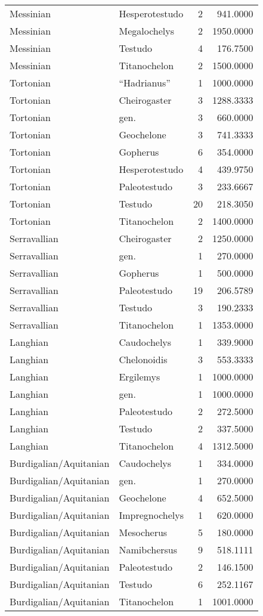 \begin{longtable}[]{@{}llrr@{}}
	Messinian & Hesperotestudo & 2 & 941.0000\tabularnewline
	Messinian & Megalochelys & 2 & 1950.0000\tabularnewline
	Messinian & Testudo & 4 & 176.7500\tabularnewline
	Messinian & Titanochelon & 2 & 1500.0000\tabularnewline
	Tortonian & ``Hadrianus'' & 1 & 1000.0000\tabularnewline
	Tortonian & Cheirogaster & 3 & 1288.3333\tabularnewline
	Tortonian & gen. & 3 & 660.0000\tabularnewline
	Tortonian & Geochelone & 3 & 741.3333\tabularnewline
	Tortonian & Gopherus & 6 & 354.0000\tabularnewline
	Tortonian & Hesperotestudo & 4 & 439.9750\tabularnewline
	Tortonian & Paleotestudo & 3 & 233.6667\tabularnewline
	Tortonian & Testudo & 20 & 218.3050\tabularnewline
	Tortonian & Titanochelon & 2 & 1400.0000\tabularnewline
	Serravallian & Cheirogaster & 2 & 1250.0000\tabularnewline
	Serravallian & gen. & 1 & 270.0000\tabularnewline
	Serravallian & Gopherus & 1 & 500.0000\tabularnewline
	Serravallian & Paleotestudo & 19 & 206.5789\tabularnewline
	Serravallian & Testudo & 3 & 190.2333\tabularnewline
	Serravallian & Titanochelon & 1 & 1353.0000\tabularnewline
	Langhian & Caudochelys & 1 & 339.9000\tabularnewline
	Langhian & Chelonoidis & 3 & 553.3333\tabularnewline
	Langhian & Ergilemys & 1 & 1000.0000\tabularnewline
	Langhian & gen. & 1 & 1000.0000\tabularnewline
	Langhian & Paleotestudo & 2 & 272.5000\tabularnewline
	Langhian & Testudo & 2 & 337.5000\tabularnewline
	Langhian & Titanochelon & 4 & 1312.5000\tabularnewline
	Burdigalian/Aquitanian & Caudochelys & 1 & 334.0000\tabularnewline
	Burdigalian/Aquitanian & gen. & 1 & 270.0000\tabularnewline
	Burdigalian/Aquitanian & Geochelone & 4 & 652.5000\tabularnewline
	Burdigalian/Aquitanian & Impregnochelys & 1 & 620.0000\tabularnewline
	Burdigalian/Aquitanian & Mesocherus & 5 & 180.0000\tabularnewline
	Burdigalian/Aquitanian & Namibchersus & 9 & 518.1111\tabularnewline
	Burdigalian/Aquitanian & Paleotestudo & 2 & 146.1500\tabularnewline
	Burdigalian/Aquitanian & Testudo & 6 & 252.1167\tabularnewline
	Burdigalian/Aquitanian & Titanochelon & 1 & 1001.0000\tabularnewline
	\bottomrule
\end{longtable}

